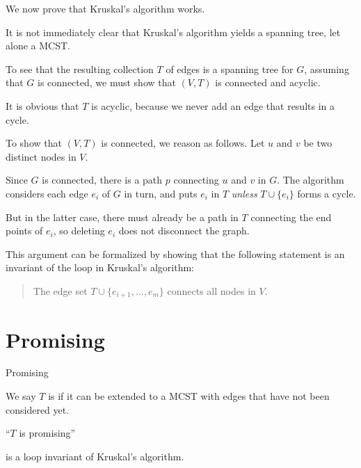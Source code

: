 \begin{frame}
We now prove that Kruskal's algorithm works.  

It is not immediately clear that Kruskal's algorithm yields a spanning
tree, let alone a MCST.  

To see that the resulting collection $T$ of edges is a spanning tree
for $G$, assuming that $G$ is connected, we must show that $(V,T)$ is
connected and acyclic.  
\end{frame}

\begin{frame}
It is obvious that $T$ is acyclic, because we never add an edge that
results in a cycle.  

To show that $(V,T)$ is connected, we reason as
follows.  Let $u$ and $v$ be two distinct nodes in $V$.  

Since $G$ is
connected, there is a path $p$ connecting $u$ and $v$ in $G$.  The
algorithm considers each edge $e_i$ of $G$ in turn, and puts $e_i$ in
$T$ {\em unless} $T\cup \{e_i\}$ forms a cycle.  

But in the latter
case, there must already be a path in $T$ connecting the end points of
$e_i$, so deleting $e_i$ does not disconnect the graph.
\end{frame}

\begin{frame}
This argument can be formalized by showing that the following
statement is an invariant of the loop in Kruskal's algorithm:

\begin{quote}
The edge set $T \cup \{e_{i+1},\ldots,e_m\}$ connects all nodes in
$V$.
\end{quote}
\end{frame}

\section{Promising}

\begin{frame}
{Promising}

We say $T$ is  if it can be extended to a MCST with
edges that have not been considered yet.

``$T$ is promising''

is a loop invariant of Kruskal's algorithm.
\end{frame}

